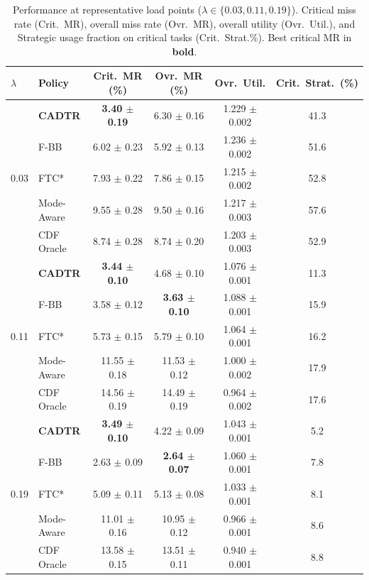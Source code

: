 \documentclass[preprint,12pt]{elsarticle}
\begin{document}
\begin{table}[t]
\centering
\caption{Performance at representative load points ($\lambda \in \{0.03, 0.11, 0.19\}$). Critical miss rate (Crit.\ MR), overall miss rate (Ovr.\ MR), overall utility (Ovr.\ Util.), and Strategic usage fraction on critical tasks (Crit.\ Strat.\%). Best critical MR in \textbf{bold}.}
\label{tab:lambda_sweep}
\begin{tabular}{l l c c c c}
\toprule
$\lambda$ & Policy & Crit.\ MR (\%) & Ovr.\ MR (\%) & Ovr.\ Util. & Crit.\ Strat.\ (\%) \\
\midrule
\multirow{5}{*}{0.03}
& \textbf{CADTR} & \textbf{3.40 $\pm$ 0.19} & 6.30 $\pm$ 0.16 & 1.229 $\pm$ 0.002 & 41.3 \\
& F-BB            & 6.02 $\pm$ 0.23          & 5.92 $\pm$ 0.13          & 1.236 $\pm$ 0.002          & 51.6 \\
& FTC*            & 7.93 $\pm$ 0.22          & 7.86 $\pm$ 0.15          & 1.215 $\pm$ 0.002          & 52.8 \\
& Mode-Aware      & 9.55 $\pm$ 0.28          & 9.50 $\pm$ 0.16          & 1.217 $\pm$ 0.003          & 57.6 \\
& CDF Oracle      & 8.74 $\pm$ 0.28          & 8.74 $\pm$ 0.20          & 1.203 $\pm$ 0.003          & 52.9 \\
\midrule
\multirow{5}{*}{0.11}
& \textbf{CADTR} & \textbf{3.44 $\pm$ 0.10} & 4.68 $\pm$ 0.10 & 1.076 $\pm$ 0.001 & 11.3 \\
& F-BB            & 3.58 $\pm$ 0.12          & \textbf{3.63 $\pm$ 0.10} & 1.088 $\pm$ 0.001          & 15.9 \\
& FTC*            & 5.73 $\pm$ 0.15          & 5.79 $\pm$ 0.10          & 1.064 $\pm$ 0.001          & 16.2 \\
& Mode-Aware      & 11.55 $\pm$ 0.18         & 11.53 $\pm$ 0.12         & 1.000 $\pm$ 0.002          & 17.9 \\
& CDF Oracle      & 14.56 $\pm$ 0.19         & 14.49 $\pm$ 0.19         & 0.964 $\pm$ 0.002          & 17.6 \\
\midrule
\multirow{5}{*}{0.19}
& \textbf{CADTR} & \textbf{3.49 $\pm$ 0.10} & 4.22 $\pm$ 0.09 & 1.043 $\pm$ 0.001 & 5.2 \\
& F-BB            & 2.63 $\pm$ 0.09          & \textbf{2.64 $\pm$ 0.07} & 1.060 $\pm$ 0.001          & 7.8 \\
& FTC*            & 5.09 $\pm$ 0.11          & 5.13 $\pm$ 0.08          & 1.033 $\pm$ 0.001          & 8.1 \\
& Mode-Aware      & 11.01 $\pm$ 0.16         & 10.95 $\pm$ 0.12         & 0.966 $\pm$ 0.001          & 8.6 \\
& CDF Oracle      & 13.58 $\pm$ 0.15         & 13.51 $\pm$ 0.11         & 0.940 $\pm$ 0.001          & 8.8 \\
\bottomrule
\end{tabular}
\end{table}
\end{document}
